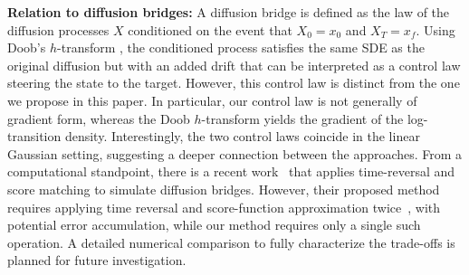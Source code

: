 \documentclass[letterpaper, 10 pt, conference]{ieeeconf}  %
\begin{document}
\noindent
{\bf Relation to diffusion bridges:} A diffusion bridge is defined as the law of the diffusion processes $X$ conditioned on the event that $X_0=x_0$ and $X_T=x_f$. Using Doob's $h$-transform \cite[Sec. 7.5]{sarkka2019applied}, the conditioned process satisfies the same SDE as the original diffusion but with an added drift that can be interpreted as a control law steering the state to the target. However, this control law is distinct from the one we propose in this paper. In particular, our control law is not generally of gradient form, whereas the Doob $h$-transform yields the gradient of the log-transition density.  Interestingly, the two control laws coincide in the linear Gaussian setting, suggesting a deeper connection between the approaches. From a computational standpoint, there is a recent work~\cite{10.1093/biomet/asaf048} that applies time-reversal and score matching to simulate diffusion bridges. However, their proposed method  requires applying time reversal and score-function approximation twice~\cite[Sec. 2.3]{10.1093/biomet/asaf048}, with potential error accumulation, while our method requires only a single such operation.
A detailed numerical comparison to fully characterize the trade-offs is planned for future investigation.

 
\end{document}
